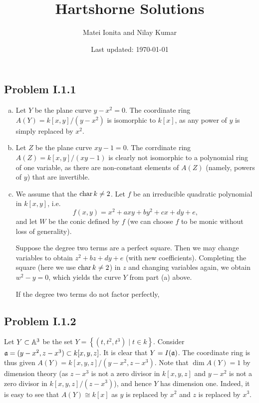 \documentclass{../mathnotes}
\title{Hartshorne Solutions}
\author{Matei Ionita and Nilay Kumar}
\date{Last updated: \today}
\begin{document}
\maketitle

\subsection*{Problem I.1.1}
\begin{enumerate}[(a)]
    \item Let $Y$ be the plane curve $y-x^2=0$. The coordinate ring $A(Y)=k[x,y]/(y-x^2)$
        is isomorphic to $k[x]$, as any power of $y$ is simply replaced by $x^2$.
    \item Let $Z$ be the plane curve $xy-1=0$. The corrdinate ring $A(Z)=k[x,y]/(xy-1)$
        is clearly not isomorphic to a polynomial ring of one variable, as there are
        non-constant elements of $A(Z)$ (namely, powers of $y$) that are invertible.
    \item We assume that the $\operatorname{char} k\neq 2$.
        Let $f$ be an irreducible quadratic polynomial in $k[x,y]$, i.e.
        \[f(x,y)=x^2+axy+by^2+cx+dy+e,\]
        and let $W$ be the conic defined by $f$ (we can choose $f$ to be monic without
        loss of generality).
        
        Suppose the degree two terms are a perfect square.
        Then we may change variables to obtain $z^2+bz+dy+e$ (with new coefficients).
        Completing the square (here we use $\operatorname{char} k\neq 2$) in $z$ and changing
        variables again, we obtain $w^2-y=0$, which yields the curve $Y$ from part
        (a) above.

        If the degree two terms do not factor perfectly, 
\end{enumerate}

\subsection*{Problem I.1.2}
Let $Y\subset \mathbb{A}^3$ be the set $Y=\left\{ (t,t^2,t^3)\mid t\in k\right\}$.
Consider $\mathfrak a=(y-x^2,z-x^3)\subset k[x,y,z]$. It is clear that $Y=I(\mathfrak a)$.
The coordinate ring is thus given $A(Y)=k[x,y,z]/(y-x^2,z-x^3)$. Note that
$\dim A(Y)=1$ by dimension theory (as $z-x^3$ is not a zero divisor in $k[x,y,z]$
and $y-x^2$ is not a zero divisor in $k[x,y,z]/(z-x^3)$), and hence $Y$
has dimension one. Indeed, it is easy to see that $A(Y)\cong k[x]$ as $y$
is replaced by $x^2$ and $z$ is replaced by $x^3$.
\end{document}
